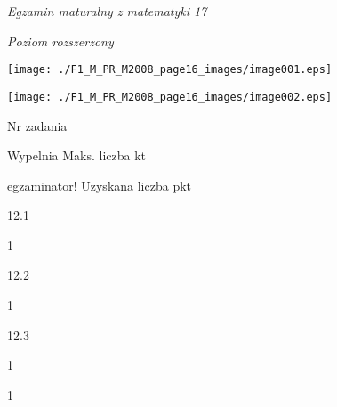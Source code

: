 \documentclass[a4paper,12pt]{article}
\begin{document}
{\it Egzamin maturalny z matematyki 17}

{\it Poziom rozszerzony}
\begin{center}
\texttt{[image: ./F1\_M\_PR\_M2008\_page16\_images/image001.eps]}

\texttt{[image: ./F1\_M\_PR\_M2008\_page16\_images/image002.eps]}
\end{center}
Nr zadania

Wypelnia Maks. liczba kt

egzaminator! Uzyskana liczba pkt

12.1

1

12.2

1

12.3

1

1
\end{document}
